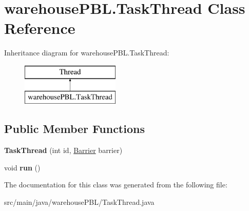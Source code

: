 \hypertarget{classwarehouse_p_b_l_1_1_task_thread}{}\section{warehouse\+P\+B\+L.\+Task\+Thread Class Reference}
\label{classwarehouse_p_b_l_1_1_task_thread}
Inheritance diagram for warehouse\+P\+B\+L.\+Task\+Thread\+:\begin{figure}[H]
\begin{center}
\leavevmode
\includegraphics[height=2.000000cm]{classwarehouse_p_b_l_1_1_task_thread}
\end{center}
\end{figure}
\subsection*{Public Member Functions}
\begin{DoxyCompactItemize}
\item 
\mbox{\label{classwarehouse_p_b_l_1_1_task_thread_a4ce9ecaa8968bd5f473804fed4f76064}} 
{\bfseries Task\+Thread} (int id, \mbox{\hyperlink{classwarehouse_p_b_l_1_1_barrier}{Barrier}} barrier)
\item 
\mbox{\label{classwarehouse_p_b_l_1_1_task_thread_a57b651c9ccd970a15154a3030356129b}} 
void {\bfseries run} ()
\end{DoxyCompactItemize}


The documentation for this class was generated from the following file\+:\begin{DoxyCompactItemize}
\item 
src/main/java/warehouse\+P\+B\+L/Task\+Thread.\+java\end{DoxyCompactItemize}
